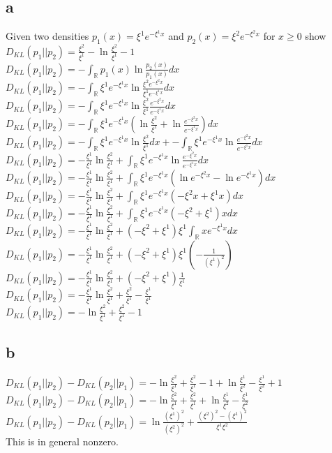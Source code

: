 \documentclass[a4paper,12pt]{article}
\begin{document}
\subsection{a}
Given two densities $p_1(x) = \xi^1e^{-\xi^1x}$ and $p_2(x) =\xi^2e^{-\xi^2x}$ for $x \geq 0$ show $D_{KL}(p_1||p_2) = \frac{\xi^2}{\xi^1} - \ln\frac{\xi^2}{\xi^1} - 1$\\
$D_{KL}(p_1||p_2) =  -\int_{\mathbb{R}}p_1(x)\ln \frac{p_2(x)}{p_1(x)}dx$\\
$D_{KL}(p_1||p_2) =  -\int_{\mathbb{R}}\xi^1e^{-\xi^1x}\ln \frac{\xi^2e^{-\xi^2x}}{\xi^1e^{-\xi^1x}}dx$\\
$D_{KL}(p_1||p_2) =  -\int_{\mathbb{R}}\xi^1e^{-\xi^1x}\ln \frac{\xi^2}{\xi^1}\frac{e^{-\xi^2x}}{e^{-\xi^1x}}dx$\\
$D_{KL}(p_1||p_2) =  -\int_{\mathbb{R}}\xi^1e^{-\xi^1x}(\ln \frac{\xi^2}{\xi^1} + \ln\frac{e^{-\xi^2x}}{e^{-\xi^1x}})dx$\\
$D_{KL}(p_1||p_2) =  -\int_{\mathbb{R}}\xi^1e^{-\xi^1x}\ln \frac{\xi^2}{\xi^1}dx + -\int_{\mathbb{R}}\xi^1e^{-\xi^1x}\ln\frac{e^{-\xi^2x}}{e^{-\xi^1x}}dx$\\
$D_{KL}(p_1||p_2) =  -\frac{\xi^1}{\xi^1}\ln \frac{\xi^2}{\xi^1} + \int_{\mathbb{R}}\xi^1e^{-\xi^1x}\ln\frac{e^{-\xi^2x}}{e^{-\xi^1x}}dx$\\
$D_{KL}(p_1||p_2) =  -\frac{\xi^1}{\xi^1}\ln \frac{\xi^2}{\xi^1} + \int_{\mathbb{R}}\xi^1e^{-\xi^1x}(\ln e^{-\xi^2x} - \ln e^{-\xi^1x})dx$\\
$D_{KL}(p_1||p_2) =  -\frac{\xi^1}{\xi^1}\ln \frac{\xi^2}{\xi^1} + \int_{\mathbb{R}}\xi^1e^{-\xi^1x}(-\xi^2x +\xi^1x)dx$\\
$D_{KL}(p_1||p_2) =  -\frac{\xi^1}{\xi^1}\ln \frac{\xi^2}{\xi^1} + \int_{\mathbb{R}}\xi^1e^{-\xi^1x}(-\xi^2 +\xi^1)xdx$\\
$D_{KL}(p_1||p_2) =  -\frac{\xi^1}{\xi^1}\ln \frac{\xi^2}{\xi^1} + (-\xi^2 +\xi^1)\xi^1\int_{\mathbb{R}}xe^{-\xi^1x}dx$\\
$D_{KL}(p_1||p_2) =  -\frac{\xi^1}{\xi^1}\ln \frac{\xi^2}{\xi^1} + (-\xi^2 +\xi^1)\xi^1(-\frac{1}{(\xi^1)^2})$\\
$D_{KL}(p_1||p_2) =  -\frac{\xi^1}{\xi^1}\ln \frac{\xi^2}{\xi^1} + (-\xi^2 +\xi^1)\frac{1}{\xi^1}$\\
$D_{KL}(p_1||p_2) =  -\frac{\xi^1}{\xi^1}\ln \frac{\xi^2}{\xi^1} + \frac{\xi^2}{\xi^1} - \frac{\xi^1}{\xi^1}$\\
$D_{KL}(p_1||p_2) =  -\ln \frac{\xi^2}{\xi^1} + \frac{\xi^2}{\xi^1} - 1$\\
\subsection{b}
$D_{KL}(p_1||p_2) - D_{KL}(p_2||p_1) = -\ln \frac{\xi^2}{\xi^1} + \frac{\xi^2}{\xi^1} - 1 +\ln \frac{\xi^1}{\xi^2} - \frac{\xi^1}{\xi^2} + 1$\\
$D_{KL}(p_1||p_2) - D_{KL}(p_2||p_1) = -\ln \frac{\xi^2}{\xi^1} + \frac{\xi^2}{\xi^1} +\ln \frac{\xi^1}{\xi^2} - \frac{\xi^1}{\xi^2}$\\
$D_{KL}(p_1||p_2) - D_{KL}(p_2||p_1) = \ln \frac{(\xi^1)^2}{(\xi^2)^2} + \frac{(\xi^2)^2 - (\xi^1)^2}{\xi^1\xi^2}$\\
This is in general nonzero.\\
\end{document}
